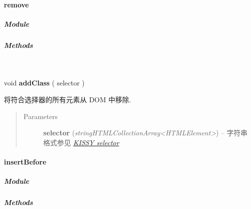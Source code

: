 \documentclass[letterpaper,10pt,english]{sphinxmanual}
\begin{document}
\paragraph{remove}
\label{api/core/dom/remove::doc}\label{api/core/dom/remove:remove}

\subparagraph{Module}
\label{api/core/dom/remove:module}\begin{quote}

{\hyperref[api/core/dom/index:module-DOM]{}}
\end{quote}


\subparagraph{Methods}
\label{api/core/dom/remove:methods}

\begin{fulllineitems}
\label{api/core/dom/remove:DOM.remove}~
\begin{DUlineblock}{0em}
\item[] void \textbf{addClass} ( selector )
\item[] 将符合选择器的所有元素从 DOM 中移除.
\end{DUlineblock}
\begin{quote}\begin{description}
\item[{Parameters}] \leavevmode
\textbf{selector} (\emph{string\textbar{}HTMLCollection\textbar{}Array\textless{}HTMLElement\textgreater{}}) -- 字符串格式参见 {\hyperref[api/core/dom/selector:dom-selector]{\emph{KISSY selector}}}

\end{description}\end{quote}

\end{fulllineitems}



\paragraph{insertBefore}
\label{api/core/dom/insertBefore::doc}\label{api/core/dom/insertBefore:insertbefore}

\subparagraph{Module}
\label{api/core/dom/insertBefore:module}\begin{quote}

{\hyperref[api/core/dom/index:module-DOM]{}}
\end{quote}


\subparagraph{Methods}
\label{api/core/dom/insertBefore:methods}
\end{document}
